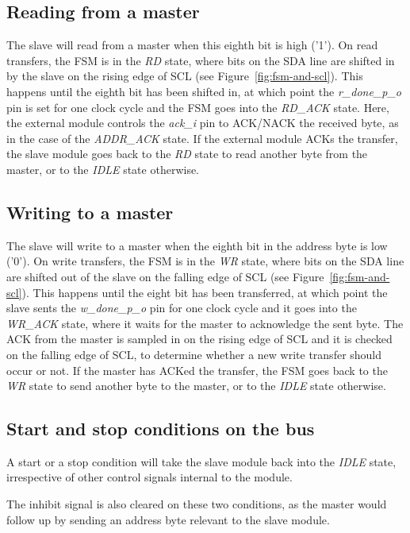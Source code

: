 \documentclass[a4paper,11pt]{article}
\begin{document}
\subsection{Reading from a master}

The slave will read from a master when this eighth bit is high ('1'). On read
transfers, the FSM is in the \textit{RD} state, where bits on the SDA line are shifted
in by the slave on the rising edge of SCL (see Figure~\ref{fig:fsm-and-scl}). This
happens until the eighth bit has been shifted in, at which point the \textit{r\_done\_p\_o}
pin is set for one clock cycle and the FSM goes into the \textit{RD\_ACK} state. Here,
the external module controls the \textit{ack\_i} pin to ACK/NACK the received byte,
as in the case of the \textit{ADDR\_ACK} state. If the external module ACKs the
transfer, the slave module goes back to the \textit{RD} state to read another byte
from the master, or to the \textit{IDLE} state otherwise.

\subsection{Writing to a master}

The slave will write to a master when the eighth bit in the address byte is low ('0').
On write transfers, the FSM is in the \textit{WR} state, where bits on the SDA line
are shifted out of the slave on the falling edge of SCL (see Figure~\ref{fig:fsm-and-scl}).
This happens until the eight bit has been transferred, at which point the slave sents
the \textit{w\_done\_p\_o} pin for one clock cycle and it goes into the \textit{WR\_ACK}
state, where it waits for the master to acknowledge the sent byte. The ACK from the master
is sampled in on the rising edge of SCL and it is checked on the falling edge of SCL,
to determine whether a new write transfer should occur or not. If the master has
ACKed the transfer, the FSM goes back to the \textit{WR} state to send another byte to
the master, or to the \textit{IDLE} state otherwise.

\subsection{Start and stop conditions on the bus}

A start or a stop condition will take the slave module back into the \textit{IDLE}
state, irrespective of other control signals internal to the module.

The inhibit signal is also cleared on these two conditions, as the master would
follow up by sending an address byte relevant to the slave module.

\pagebreak


\end{document}
